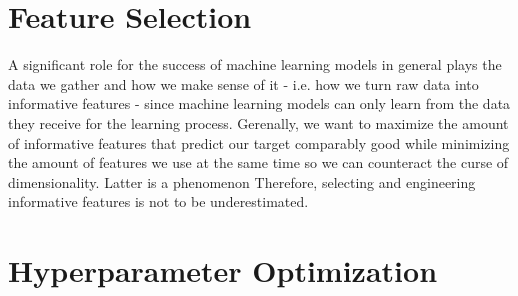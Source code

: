 \section{Feature Selection}

A significant role for the success of machine learning models in general plays the data we gather and how we make sense of it - i.e. how we turn raw data into informative features - since machine learning models can only learn from the data they receive for the learning process. Gerenally, we want to maximize the amount of informative features that predict our target comparably good while minimizing the amount of features we use at the same time so we can counteract the curse of dimensionality. Latter is a phenomenon  
\newline
{} 
\newline
\newline
Therefore, selecting and engineering informative features is not to be underestimated. 

\section{Hyperparameter Optimization}


